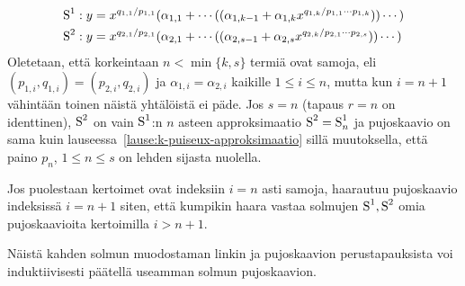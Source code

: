 \begin{align*}
    \text{S}^1&:y=x^{q_{1,1}/p_{1,1}}(\alpha_{1,1}+\cdots((\alpha_{1,k-1}+\alpha_{1,k}x^{q_{1,k}/p_{1,1}\cdots p_{1,k}}))\cdots) \\
    \text{S}^2&:y=x^{q_{2,1}/p_{2,1}}(\alpha_{2,1}+\cdots((\alpha_{2,s-1}+\alpha_{2,s}x^{q_{2,k}/p_{2,1}\cdots p_{2,s}}))\cdots) \\
\end{align*}
Oletetaan, että korkeintaan $n<\min\{k,s\}$ termiä ovat samoja, eli $(p_{1,i},q_{1,i})=(p_{2,i},q_{2,i})$ ja $\alpha_{1,i}=\alpha_{2,i}$ kaikille $1\leq i\leq n$, mutta kun $i=n+1$ vähintään toinen näistä yhtälöistä ei päde. Jos $s=n$ (tapaus $r=n$ on identtinen), $\text{S}^2$ on vain $\text{S}^1$:n $n$ asteen approksimaatio $\text{S}^2=\text{S}_n^1$ ja pujoskaavio on sama kuin lauseessa~\ref{lause:k-puiseux-approksimaatio} sillä muutoksella, että paino $p_n$, $1\leq n\leq s$ on lehden sijasta nuolella.

Jos puolestaan kertoimet ovat indeksiin $i=n$ asti samoja, haarautuu pujoskaavio indeksissä $i=n+1$ siten, että kumpikin haara vastaa solmujen $\text{S}^1,\text{S}^2$ omia pujoskaavioita kertoimilla $i>n+1$.

Näistä kahden solmun muodostaman linkin ja pujoskaavion perustapauksista voi induktiivisesti päätellä useamman solmun pujoskaavion.

